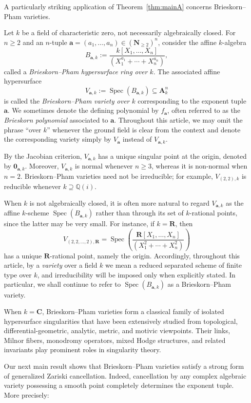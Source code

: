 \documentclass[english,10pt,reqno,twoside]{amsart}
\numberwithin{equation}{section}
\numberwithin{figure}{section}
\theoremstyle{plain}
\theoremstyle{plain}
\theoremstyle{definition}
\theoremstyle{plain}
\numberwithin{equation}{section}
\newcommand{\A}{\mathbf{A}}
\newcommand{\C}{\mathbf{C}}
\newcommand{\N}{\mathbf{N}}
\newcommand{\oo}{\mathbf{0}}
\newcommand{\Q}{\mathbb{Q}}
\newcommand{\R}{\mathbf{R}}
\newcommand{\ba}{\mathbf{a}}
\newcommand{\Spec}{\operatorname{Spec}}
\begin{document}
A particularly striking application of Theorem~\ref{thm:mainA} concerns Brieskorn--Pham varieties.

\medskip

Let $k$ be a field of characteristic zero, not necessarily algebraically closed. For $n\geq 2$ and an $n$-tuple $\ba=(a_1,\ldots,a_n)\in(\N_{\geq 2})^n$, consider the affine $k$-algebra
\[
B_{\ba,k}:=
\frac{k[X_1,\ldots,X_n]}{(X_1^{a_1}+\cdots+X_n^{a_n})},
\]
called a \emph{Brieskorn--Pham hypersurface ring over $k$}. The associated affine hypersurface
\[
V_{\ba,k}:=\Spec(B_{\ba,k})\subseteq \A^n_k
\]
is called the \emph{Brieskorn--Pham variety over $k$} corresponding to the exponent tuple $\ba$. We sometimes denote the defining polynomial by $f_\ba$, often referred to as the \emph{Brieskorn polynomial} associated to $\ba$. Throughout this article, we may omit the phrase ``over $k$'' whenever the ground field is clear from the context and denote the corresponding variety simply by $V_\ba$ instead of $V_{\ba,k}$.

By the Jacobian criterion, $V_{\ba,k}$ has a unique singular point at the origin, denoted by $\oo_{\ba,k}$. Moreover, $V_{\ba,k}$ is normal whenever $n\geq 3$, whereas it is non-normal when $n=2$. Brieskorn--Pham varieties need not be irreducible; for example, $V_{(2,2),k}$ is reducible whenever $k\supseteq \Q(i)$.

When $k$ is not algebraically closed, it is often more natural to regard $V_{\ba,k}$ as the affine $k$-scheme $\Spec(B_{\ba,k})$ rather than through its set of $k$-rational points, since the latter may be very small. For instance, if $k=\R$, then
\[
V_{(2,2,\ldots,2),\R}
=\Spec\left(
\frac{\R[X_1,\ldots,X_n]}
{(X_1^2+\cdots+X_n^2)}
\right)
\]
has a unique $\R$-rational point, namely the origin. Accordingly, throughout this article, by a \emph{variety} over a field $k$ we mean a reduced separated scheme of finite type over $k$, and irreducibility will be imposed only when explicitly stated. In particular, we shall continue to refer to $\Spec(B_{\ba,k})$ as a Brieskorn--Pham variety.

When $k=\C$, Brieskorn--Pham varieties form a classical family of isolated hypersurface singularities that have been extensively studied from topological, differential-geometric, analytic, metric, and motivic viewpoints. Their links, Milnor fibers, monodromy operators, mixed Hodge structures, and related invariants play prominent roles in singularity theory.

Our next main result shows that Brieskorn--Pham varieties satisfy a strong form of generalized Zariski cancellation. Indeed, cancellation by any complex algebraic variety possessing a smooth point completely determines the exponent tuple. More precisely:
\end{document}
